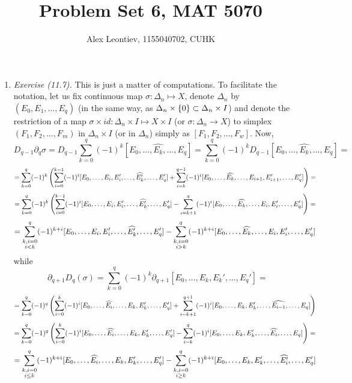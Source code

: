 \documentclass[8pt]{article} %
\title{Problem Set 6, MAT 5070}
\author{Alex Leontiev, 1155040702, CUHK}
\begin{document}
\maketitle
\limits\begin{enumerate}[label=\bfseries \arabic*.]
	\item{{\it Exercise (11.7).} This is just a matter of computations. To facilitate the notation, let us fix continuous
		map $\sigma:\Delta_n\mapsto X$,
		denote $\Delta_n$ by $(E_0,E_1,\dots,E_q)$ (in the same way, as $\Delta_n\times\left\{0\right\}\subset\Delta_n\times I$) and denote
		the restriction of a map $\sigma\times id:\Delta_n\times I\mapsto X\times I$ (or $\sigma:\Delta_n\to X$) to simplex
		$(F_1,F_2,\dots,F_m)$ in $\Delta_n\times I$ (or in $\Delta_n$) simply as $[F_1,F_2,\dots,F_w]$. Now,
		\[D_{q-1}\partial_q\sigma=D_{q-1}\sum_{k=0}^q(-1)^k[E_0,\hdots,\widehat{E_k},\hdots,E_q]=\sum_{k=0}^q(-1)^kD_{q-1}
		[E_0,\hdots,\widehat{E_k},\hdots,E_q]=\]
		\[=\sum_{k=0}^q(-1)^k\mybra{\sum_{i=0}^{k-1}(-1)^i[E_0,\dots,E_i,E_i',\dots,\widehat{E_{k}'},\dots,E_q']+
		\sum_{i=k}^{q-1}(-1)^i [E_0,\dots,\widehat{E_{k}},\dots,E_{i+1},E_{i+1}',\dots,E_q']}=\]
		\[=\sum_{k=0}^q(-1)^k\mybra{\sum_{i=0}^{k-1}(-1)^i[E_0,\dots,E_i,E_i',\dots,\widehat{E_{k}'},\dots,E_q']-
		\sum_{i=k+1}^{q}(-1)^i [E_0,\dots,\widehat{E_{k}},\dots,E_{i},E_{i}',\dots,E_q']}=\]
		\[=\sum_{\begin{subarray}{c}k,i=0\\i< k\end{subarray}}^q(-1)^{k+i}[E_0,\dots,E_i,E_i',\dots,\widehat{E_{k}'},\dots,E_q']-
		\sum_{\begin{subarray}{c}k,i=0\\i>k\end{subarray}}^q(-1)^{k+i}[E_0,\dots,\widehat{E_{k}},\dots,E_{i},E_{i}',\dots,E_q']\]
		while \[\partial_{q+1}D_q(\sigma)=\sum_{k=0}^q(-1)^k\partial_{q+1}[E_0,\dots,E_k,E_k',\dots,E_q']=\]
		\[=\sum_{k=0}^q(-1)^q\mybra{\sum_{i=0}^k(-1)^i[E_0,\dots,\widehat{E_i},\dots,E_k,E_k',\dots,E_q']+\sum_{i=k+1}^{q+1}
		(-1)^i[E_0,\dots,E_k,E_k',\dots,\widehat{E_{i-1}},\dots,E_q]}\]
		\[=\sum_{k=0}^q(-1)^q\mybra{\sum_{i=0}^k(-1)^i[E_0,\dots,\widehat{E_i},\dots,E_k,E_k',\dots,E_q']-\sum_{i=k}^{q}
		(-1)^i[E_0,\dots,E_k,E_k',\dots,\widehat{E_{i}},\dots,E_q]}=\]
		\[=\sum_{\begin{subarray}{c}k,i=0\\i\leq k\end{subarray}}^q(-1)^{k+i}[E_0,\dots,\widehat{E_i},\dots,E_k,E_k',\dots,E_q']-
		\sum_{\begin{subarray}{c}k,i=0\\i\geq k\end{subarray}}^q(-1)^{k+i}[E_0,\dots,E_k,E_k',\dots,\widehat{E_{i}'},\dots,E_q']\]
}
\end{enumerate}
\end{document}
